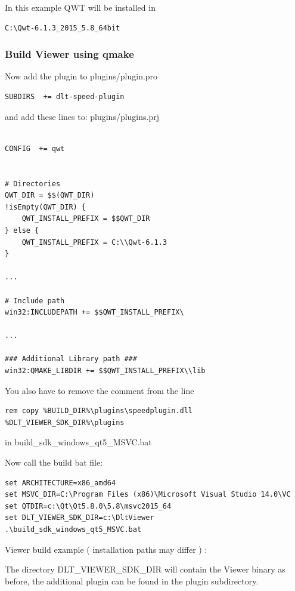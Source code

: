 \documentclass[a4paper,11pt]{article}
\begin{document}
In this example QWT will be installed in
\begin{verbatim}
C:\Qwt-6.1.3_2015_5.8_64bit
\end{verbatim}

\subsubsection{Build Viewer using qmake}

Now add the plugin to plugins/plugin.pro

\begin{verbatim}
SUBDIRS  += dlt-speed-plugin
\end{verbatim}

and add these lines to: plugins/plugins.prj

\begin{verbatim}

CONFIG  += qwt


# Directories
QWT_DIR = $$(QWT_DIR)
!isEmpty(QWT_DIR) {
    QWT_INSTALL_PREFIX = $$QWT_DIR
} else {
    QWT_INSTALL_PREFIX = C:\\Qwt-6.1.3
}

...

# Include path
win32:INCLUDEPATH += $$QWT_INSTALL_PREFIX\

...

### Additional Library path ###
win32:QMAKE_LIBDIR += $$QWT_INSTALL_PREFIX\\lib

\end{verbatim}

You also have to remove the comment from the line
\begin{verbatim}
rem copy %BUILD_DIR%\plugins\speedplugin.dll %DLT_VIEWER_SDK_DIR%\plugins
\end{verbatim}
in build\_sdk\_windows\_qt5\_MSVC.bat

Now call the build bat file:

\begin{verbatim}
set ARCHITECTURE=x86_amd64
set MSVC_DIR=C:\Program Files (x86)\Microsoft Visual Studio 14.0\VC
set QTDIR=c:\Qt\Qt5.8.0\5.8\msvc2015_64
set DLT_VIEWER_SDK_DIR=c:\DltViewer
.\build_sdk_windows_qt5_MSVC.bat
\end{verbatim}


Viewer build example ( installation paths may differ ) :

The directory DLT\_VIEWER\_SDK\_DIR will contain the Viewer binary as before, the additional plugin can be found
in the plugin subdirectory.
\end{document}
